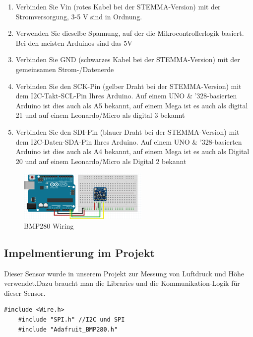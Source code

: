 \documentclass[conference]{IEEEtran}
\begin{document}
\begin{enumerate}
\item 
	Verbinden Sie Vin (rotes Kabel bei der STEMMA-Version) mit der Stromversorgung, 3-5 V sind in Ordnung. 
\item  Verwenden Sie dieselbe Spannung, auf der die Mikrocontrollerlogik basiert. Bei den meisten Arduinos sind das 5V
	
\item  Verbinden Sie GND (schwarzes Kabel bei der STEMMA-Version) mit der gemeinsamen Strom-/Datenerde
	
\item 	Verbinden Sie den SCK-Pin (gelber Draht bei der STEMMA-Version) mit dem I2C-Takt-SCL-Pin Ihres Arduino.  Auf einem UNO \& '328-basierten Arduino ist dies auch als A5 bekannt, auf einem Mega ist es auch als digital 21 und auf einem Leonardo/Micro als digital 3 bekannt
	
\item Verbinden Sie den SDI-Pin (blauer Draht bei der STEMMA-Version) mit dem I2C-Daten-SDA-Pin Ihres Arduino. Auf einem UNO \& '328-basierten Arduino ist dies auch als A4 bekannt, auf einem Mega ist es auch als Digital 20 und auf einem Leonardo/Micro als Digital 2 bekannt
\end{enumerate}

\begin{figure} [h]
	\centering
	\includegraphics[width=0.8\linewidth]{fig36}
	\caption{BMP280 Wiring }
	\label{fig:fig36}
\end{figure}

\subsection{Impelmentierung im Projekt }

Dieser Sensor wurde in unserem Projekt zur Messung von Luftdruck und Höhe verwendet.Dazu braucht man die Libraries und die Kommunikation-Logik für dieser Sensor. 

\begin{lstlisting}[style=CStyle]
	#include <Wire.h>
	#include "SPI.h" //I2C und SPI
	#include "Adafruit_BMP280.h"
\end{lstlisting}
\end{document}

